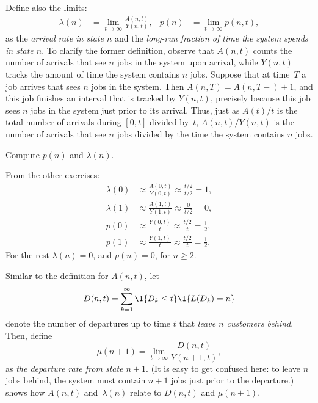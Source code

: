 Define also the limits:
\begin{align}\label{eq:p(n)}
 \lambda(n) &= \lim_{t\to\infty} \frac{A(n,t)}{Y(n,t)}, &p(n) &=\lim_{t\to\infty} p(n,t),
\end{align}
as the \emph{arrival rate in state $n$} and the \emph{long-run fraction of
 time the system spends in state $n$}. To clarify the former
definition, observe that $A(n,t)$ counts the number of arrivals that
see $n$ jobs in the system upon arrival, while $Y(n,t)$ tracks the amount of time
the system contains $n$ jobs. Suppose that at time~$T$ a job arrives that
sees $n$ jobs in the system. Then $A(n,T)=A(n, T-)+1$, and this job finishes
an interval that is tracked by $Y(n,t)$, precisely because this job
sees $n$ jobs in the system just prior to its arrival. Thus, just as
$A(t)/t$ is the total number of arrivals during $[0,t]$ divided by~$t$, $A(n,t)/Y(n,t)$ is the number of arrivals that see $n$ jobs divided by
the time the system contains $n$ jobs.

\begin{exercise}  
Compute $p(n)$ and $\lambda(n)$.
\begin{solution}
 From the other exercises:
 \begin{align*}
 \lambda(0) &\approx \frac{A(0,t)}{Y(0,t)} \approx \frac{t/2}{t/2} = 1, \\
 \lambda(1) &\approx \frac{A(1,t)}{Y(1,t)} \approx \frac{0}{t/2} = 0, \\
 p(0) &\approx \frac{Y(0,t)}{t} \approx \frac{t/2}{t} = \frac 1 2, \\
 p(1) &\approx \frac{Y(1,t)}{t} \approx \frac{t/2}{t} = \frac 1 2.
 \end{align*}
For the rest $\lambda(n) = 0$, and $p(n)=0$, for $n\geq 2$.
\end{solution}
\end{exercise}

Similar to the definition for $A(n,t)$, let
\begin{equation*}
 D(n,t) = \sum_{k=1}^\infty \1{D_k \leq t} \1{L(D_k) = n}
 \end{equation*}
 denote the number of departures up to time $t$ that\emph{ leave $n$
 customers behind}. Then, define
\begin{equation*}
 \mu(n+1) = \lim_{t\to\infty} \frac{D(n,t)}{Y(n+1,t)},
\end{equation*}
as \emph{ the departure rate from state $n+1$}.
(It is easy to get confused here: to leave $n$ jobs behind, the system must contain $n+1$ jobs just prior to the departure.)
 shows how $A(n,t)$ and~$\lambda(n)$ relate to $D(n,t)$ and $\mu(n+1)$.

